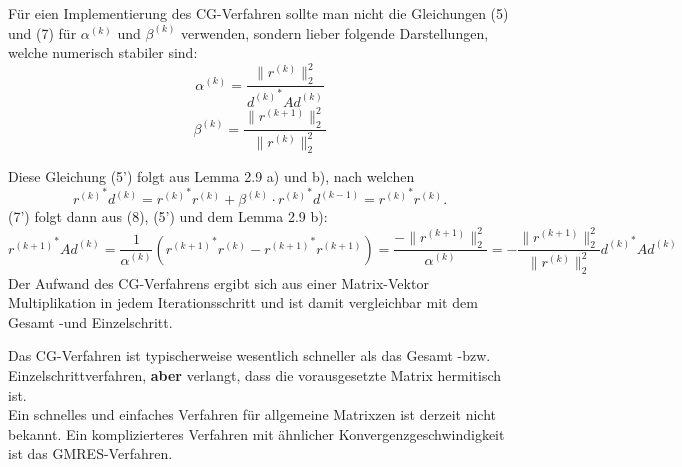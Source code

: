 \documentclass{article}
\begin{document}
    \begin{rembox}
        Für eien Implementierung des CG-Verfahren sollte man nicht die Gleichungen (5) und (7) für $\alpha^{(k)}$ 
        und $\beta^{(k)}$ verwenden, sondern lieber folgende Darstellungen, welche numerisch stabiler sind:
        \[\alpha^{(k)} = \dfrac{\|r^{(k)}\|_2^2}{{d^{(k)}}^*Ad^{(k)}} \tag{5'}\]
        \[\beta^{(k)} = \dfrac{\|r^{(k+1)}\|_2^2}{\|r^{(k)}\|_2^2} \tag{7'}\]
    \end{rembox}
    Diese Gleichung (5') folgt aus Lemma 2.9 a) und b), nach welchen
    \[{r^{(k)}}^*d^{(k)} = {r^{(k)}}^*r^{(k)} + \beta^{(k)}\cdot {r^{(k)}}^*d^{(k-1)} = {r^{(k)}}^*r^{(k)}.\]
    (7') folgt dann aus (8), (5') und dem Lemma 2.9 b):
    \[{r^{(k+1)}}^*Ad^{(k)} = \dfrac{1}{\alpha^{(k)}}\left({r^{(k+1)}}^*r^{(k)} - {r^{(k+1)}}^*r^{(k+1)}\right) 
    =\dfrac{-\|r^{(k+1)}\|_2^2}{\alpha^{(k)}} = -\dfrac{\|r^{(k+1)}\|_2^2}{\|r^{(k)}\|_2^2}{d^{(k)}}^*Ad^{(k)}\] 
    Der Aufwand des CG-Verfahrens ergibt sich aus einer Matrix-Vektor Multiplikation in jedem Iterationsschritt 
    und ist damit vergleichbar mit dem Gesamt -und Einzelschritt.
    \begin{rembox}
        Das CG-Verfahren ist typischerweise wesentlich schneller als das Gesamt -bzw. Einzelschrittverfahren, 
        \textbf{aber} verlangt, dass die vorausgesetzte Matrix hermitisch ist. \\
        Ein schnelles und einfaches Verfahren für allgemeine Matrixzen ist derzeit nicht bekannt. Ein komplizierteres 
        Verfahren mit ähnlicher Konvergenzgeschwindigkeit ist das GMRES-Verfahren. 
    \end{rembox}
\end{document}
